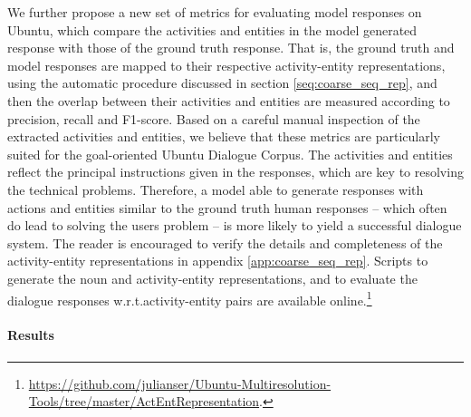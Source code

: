 \documentclass{article}
\begin{document}
We further propose a new set of metrics for evaluating model responses on Ubuntu, which compare the activities and entities in the model generated response with those of the ground truth response.
That is, the ground truth and model responses are mapped to their respective activity-entity representations, using the automatic procedure discussed in section \ref{seq:coarse_seq_rep},
and then the overlap between their activities and entities are measured according to precision, recall and F1-score.
Based on a careful manual inspection of the extracted activities and entities, we believe that these metrics are particularly suited for the goal-oriented Ubuntu Dialogue Corpus. 
The activities and entities reflect the principal instructions given in the responses, which are key to resolving the technical problems.
Therefore, a model able to generate responses with actions and entities similar to the ground truth human responses -- which often do lead to solving the users problem -- is more likely to yield a successful dialogue system.
The reader is encouraged to verify the details and completeness of the activity-entity representations in appendix \ref{app:coarse_seq_rep}.
Scripts to generate the noun and activity-entity representations, and to evaluate the dialogue responses w.r.t.\@ activity-entity pairs are available online.\footnote{\url{https://github.com/julianser/Ubuntu-Multiresolution-Tools/tree/master/ActEntRepresentation}.}
















\paragraph{Results}
\end{document}
